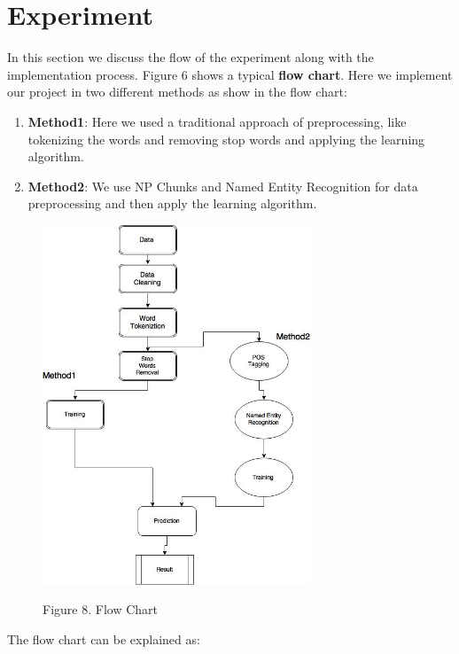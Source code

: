 \documentclass[fleqn,10pt]{SelfArx} %
\begin{document}
\section{Experiment}
In this section we discuss the flow of the experiment along with the implementation process. Figure 6 shows a typical \textbf{flow chart}. Here we implement our project in two different methods as show in the flow chart:
\begin{enumerate}
\item \textbf{Method1}: Here we used a traditional approach of preprocessing, like tokenizing the words and removing stop words and applying the learning algorithm.
\item \textbf{Method2}: We use NP Chunks and Named Entity Recognition for data preprocessing and then apply the learning algorithm.
\end{enumerate}
\begin{figure}
\begin{minipage}[b]{1.0\linewidth}
  \centering
  \centerline{\includegraphics[width=8cm]{Flowchart2}}
  \centerline{Figure 8. Flow Chart}\medskip
\end{minipage}
\end{figure}
The flow chart can be explained as:
\end{document}
